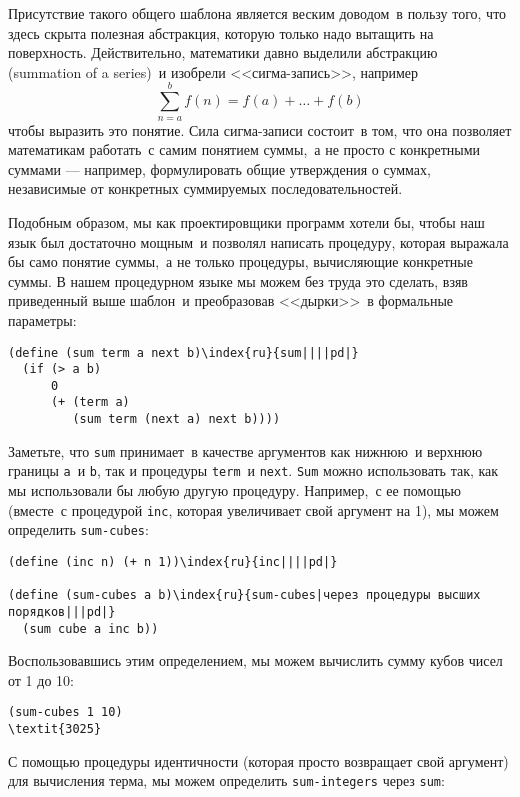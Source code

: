 Присутствие такого общего шаблона является веским доводом~в пользу того, что здесь
скрыта полезная абстракция, которую только надо вытащить на
поверхность.  Действительно, математики давно выделили абстракцию 
 (summation of a series)~и изобрели <<сигма-запись>>, например
$$
\sum_{n=a}^b f(n) = f(a) + \ldots + f(b)
$$
чтобы выразить это понятие.  Сила сигма-записи состоит~в том, что
она позволяет математикам работать~с самим понятием суммы,~а не просто 
с конкретными суммами --- например, формулировать общие утверждения о
суммах, независимые от конкретных суммируемых
последовательностей.

Подобным образом, мы как проектировщики программ хотели бы, 
чтобы наш язык был достаточно мощным~и позволял написать
процедуру, которая выражала бы само понятие суммы,~а не только процедуры, 
вычисляющие конкретные суммы. В нашем процедурном языке мы можем без
труда это сделать, взяв приведенный выше шаблон~и преобразовав
<<дырки>>~в формальные параметры:

\begin{Verbatim}[fontsize=\small]
(define (sum term a next b)\index{ru}{sum||||pd|}
  (if (> a b)
      0
      (+ (term a)
         (sum term (next a) next b))))
\end{Verbatim}
Заметьте, что {\tt sum} принимает~в качестве аргументов как
нижнюю~и верхнюю границы {\tt a}~и {\tt b}, так и
процедуры {\tt term}~и {\tt next}. {\tt Sum}
можно использовать так, как мы использовали бы любую другую
процедуру. Например,~с ее помощью (вместе~с процедурой
{\tt inc}, которая увеличивает свой аргумент на 1), мы можем
определить {\tt sum-cubes}:

\begin{Verbatim}[fontsize=\small]
(define (inc n) (+ n 1))\index{ru}{inc||||pd|}

(define (sum-cubes a b)\index{ru}{sum-cubes|через процедуры высших порядков|||pd|}
  (sum cube a inc b))
\end{Verbatim}
Воспользовавшись этим определением, мы можем вычислить сумму кубов чисел от 1
до 10:

\begin{Verbatim}[fontsize=\small]
(sum-cubes 1 10)
\textit{3025}
\end{Verbatim}
С помощью процедуры идентичности (которая просто возвращает свой
аргумент) для вычисления терма, мы можем определить
{\tt sum-integers} через {\tt sum}:

